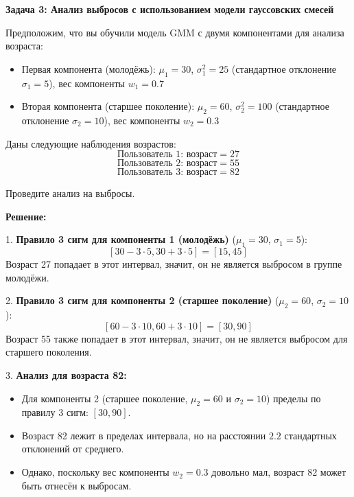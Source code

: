 \textbf{Задача 3: Анализ выбросов с использованием модели гауссовских смесей}

Предположим, что вы обучили модель GMM с двумя компонентами для анализа возраста:

\begin{itemize}
    \item Первая компонента (молодёжь): $\mu_1 = 30$, $\sigma_1^2 = 25$ (стандартное отклонение $\sigma_1 = 5$), вес компоненты $w_1 = 0.7$
    \item Вторая компонента (старшее поколение): $\mu_2 = 60$, $\sigma_2^2 = 100$ (стандартное отклонение $\sigma_2 = 10$), вес компоненты $w_2 = 0.3$
\end{itemize}

Даны следующие наблюдения возрастов:
\[
\text{Пользователь 1: возраст} = 27
\]
\[
\text{Пользователь 2: возраст} = 55
\]
\[
\text{Пользователь 3: возраст} = 82
\]

Проведите анализ на выбросы.

\noindent\textbf{Решение:}

1. \textbf{Правило 3 сигм для компоненты 1 (молодёжь)} ($\mu_1 = 30$, $\sigma_1 = 5$):
\[
[30 - 3 \cdot 5, 30 + 3 \cdot 5] = [15, 45]
\]
Возраст 27 попадает в этот интервал, значит, он не является выбросом в группе молодёжи.

2. \textbf{Правило 3 сигм для компоненты 2 (старшее поколение)} ($\mu_2 = 60$, $\sigma_2 = 10$):
\[
[60 - 3 \cdot 10, 60 + 3 \cdot 10] = [30, 90]
\]
Возраст 55 также попадает в этот интервал, значит, он не является выбросом для старшего поколения.

3. \textbf{Анализ для возраста 82:}
    \begin{itemize}
        \item Для компоненты 2 (старшее поколение, $\mu_2 = 60$ и $\sigma_2 = 10$) пределы по правилу 3 сигм: $[30, 90]$.
        \item Возраст 82 лежит в пределах интервала, но на расстоянии $2.2$ стандартных отклонений от среднего.
        \item Однако, поскольку вес компоненты $w_2 = 0.3$ довольно мал, возраст 82 может быть отнесён к выбросам.
    \end{itemize}

